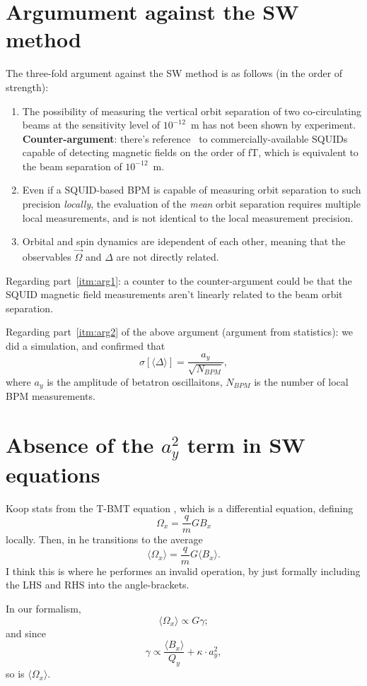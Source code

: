 \documentclass[12pt]{elsarticle}
\newcommand{\W}{\Omega}
\newcommand{\avg}[1]{\langle{#1}\rangle}
\begin{document}
\section{Argumument against the SW method}
The three-fold argument against the SW method is as follows (in the order of strength):
\begin{enumerate}[(1)]
\item The possibility of measuring the vertical orbit separation of two co-circulating beams
  at the sensitivity level of $10^{-12}$~m has not been shown by experiment.
  \textbf{Counter-argument}: there's reference~\cite{Kawal} to commercially-available SQUIDs
  capable of detecting magnetic fields on the order of fT, which is equivalent to the beam separation
  of $10^{-12}$~m. \label{itm:arg1}
\item Even if a SQUID-based BPM is capable of measuring orbit separation to such precision \emph{locally}, the
  evaluation of the \emph{mean} orbit separation requires multiple local measurements,
  and is not identical to the local measurement precision.\label{itm:arg2}
\item Orbital and spin dynamics are idependent of each other, meaning that the observables
  $\vec\Omega$ and $\Delta$ are not directly related.\label{itm:arg2}
\end{enumerate}

Regarding part~\ref{itm:arg1}: a counter to the counter-argument could be that the SQUID
magnetic field measurements aren't linearly related to the beam orbit separation.

Regarding part~\ref{itm:arg2} of the above argument (argument from statistics):
we did a simulation, and confirmed that
\[
\sigma[\avg{\Delta}] = \frac{a_y}{\sqrt{N_{BPM}}},
\]
where $a_y$ is the amplitude of betatron oscillaitons, $N_{BPM}$ is the number of local BPM measurements.


\section{Absence of the $a_y^2$ term in SW equations}

Koop stats from the T-BMT equation , which is a differential equation, defining
\[
\W_x = \frac qmGB_x
\]
locally.
Then, in  he transitions to the average
\[
\avg{\W_x} = \frac qmG\avg{B_x}.
\]
I think this is where he performes
an invalid operation, by just formally including the LHS and RHS into the angle-brackets.

In our formalism,
\begin{equation}\label{eq:spin-tune-main}
\avg{\W_x} \propto G\gamma;
\end{equation}
and since
\[
\gamma \propto \frac{\avg{B_x}}{Q_y} + \kappa\cdot a_y^2,
\]
so is $\avg{\W_x}$.
\end{document}
